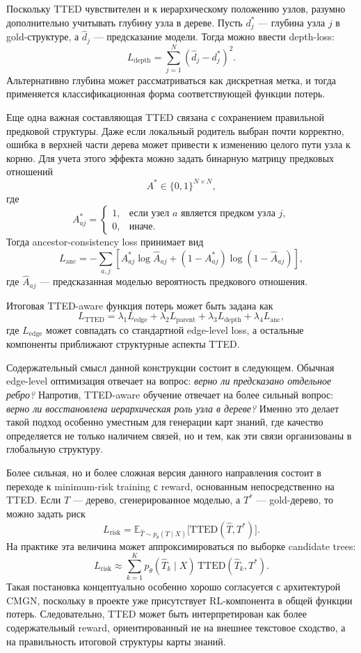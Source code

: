 \documentclass[12pt,a4paper]{article}
\begin{document}
Поскольку TTED чувствителен и к иерархическому положению узлов, разумно дополнительно учитывать глубину узла в дереве. Пусть $d_j^\ast$ --- глубина узла $j$ в gold-структуре, а $\hat{d}_j$ --- предсказание модели. Тогда можно ввести depth-loss:
\[
L_{\mathrm{depth}}
=
\sum_{j=1}^{N}
(\hat{d}_j - d_j^\ast)^2.
\]
Альтернативно глубина может рассматриваться как дискретная метка, и тогда применяется классификационная форма соответствующей функции потерь.

Еще одна важная составляющая TTED связана с сохранением правильной предковой структуры. Даже если локальный родитель выбран почти корректно, ошибка в верхней части дерева может привести к изменению целого пути узла к корню. Для учета этого эффекта можно задать бинарную матрицу предковых отношений
\[
A^\ast \in \{0,1\}^{N \times N},
\]
где
\[
A^\ast_{aj} =
\begin{cases}
1, & \text{если узел } a \text{ является предком узла } j,\\
0, & \text{иначе.}
\end{cases}
\]
Тогда ancestor-consistency loss принимает вид
\[
L_{\mathrm{anc}}
=
-\sum_{a,j}
\left[
A^\ast_{aj}\log \hat{A}_{aj}
+
(1-A^\ast_{aj})\log(1-\hat{A}_{aj})
\right],
\]
где $\hat{A}_{aj}$ --- предсказанная моделью вероятность предкового отношения.

Итоговая TTED-aware функция потерь может быть задана как
\[
L_{\mathrm{TTED}}
=
\lambda_1 L_{\mathrm{edge}}
+
\lambda_2 L_{\mathrm{parent}}
+
\lambda_3 L_{\mathrm{depth}}
+
\lambda_4 L_{\mathrm{anc}},
\]
где $L_{\mathrm{edge}}$ может совпадать со стандартной edge-level loss, а остальные компоненты приближают структурные аспекты TTED.

Содержательный смысл данной конструкции состоит в следующем. Обычная edge-level оптимизация отвечает на вопрос: \emph{верно ли предсказано отдельное ребро?} Напротив, TTED-aware обучение отвечает на более сильный вопрос: \emph{верно ли восстановлена иерархическая роль узла в дереве?} Именно это делает такой подход особенно уместным для генерации карт знаний, где качество определяется не только наличием связей, но и тем, как эти связи организованы в глобальную структуру.

Более сильная, но и более сложная версия данного направления состоит в переходе к minimum-risk training с reward, основанным непосредственно на TTED. Если $\hat{T}$ --- дерево, сгенерированное моделью, а $T^\ast$ --- gold-дерево, то можно задать риск
\[
L_{\mathrm{risk}}
=
\mathbb{E}_{\hat{T}\sim p_\theta(T\mid X)}
\bigl[
\mathrm{TTED}(\hat{T},T^\ast)
\bigr].
\]
На практике эта величина может аппроксимироваться по выборке candidate trees:
\[
L_{\mathrm{risk}}
\approx
\sum_{k=1}^{K}
p_\theta(\hat{T}_k\mid X)\,
\mathrm{TTED}(\hat{T}_k,T^\ast).
\]
Такая постановка концептуально особенно хорошо согласуется с архитектурой CMGN, поскольку в проекте уже присутствует RL-компонента в общей функции потерь. Следовательно, TTED может быть интерпретирован как более содержательный reward, ориентированный не на внешнее текстовое сходство, а на правильность итоговой структуры карты знаний.
\end{document}
